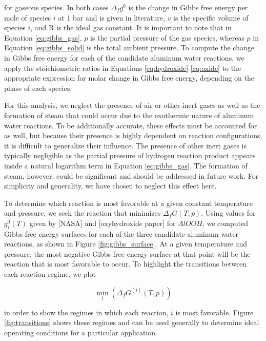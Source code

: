 \documentclass[preprint,12pt,3p]{elsarticle}
\begin{document}
\noindent for gaseous species. In both cases $\Delta_f g^0$ is the change in
Gibbs free energy per mole of species $i$ at 1 bar and is given in literature,
$v$ is the specific volume of species $i$, and R is the ideal gas constant. It
is important to note that in Equation \ref{eq:gibbs_gas}, $p$ is the partial
pressure of the gas species, whereas $p$ in Equation \ref{eq:gibbs_solid} is the
total ambient pressure. To compute the change in Gibbs free energy for each of
the candidate aluminum water reactions, we apply the stoichiometric ratios in
Equations \ref{eq:hydroxide}-\ref{eq:oxide} to the appropriate expression for
molar change in Gibbs free energy, depending on the phase of each species.

For this analysis, we neglect the presence of air or other inert gases as well
as the formation of steam that could occur due to the exothermic nature of
aluminum water reactions. To be additionally accurate, these effects must be
accounted for as well, but because their presence is highly dependent on
reaction configurations, it is difficult to generalize their influence. The
presence of other inert gases is typically negligible as the partial pressure of
hydrogen reaction product appears inside a natural logarithm term in Equation
\ref{eq:gibbs_gas}. The formation of steam, however, could be significant and
should be addressed in future work. For simplicity and generality, we have
chosen to neglect this effect here.

To determine which reaction is most favorable at a given constant temperature
and pressure, we seek the reaction that minimizes $\Delta_f G(T,p)$. Using
values for $g_i^0(T)$ given by [NASA] and [oxyhydroxide paper] for $AlOOH$, we
computed Gibbs free energy surfaces for each of the three candidate aluminum
water reactions, as shown in Figure \ref{fig:gibbs_surface}. At a given
temperature and pressure, the most negative Gibbs free energy surface at that
point will be the reaction that is most favorable to occur. To highlight the
transitions between each reaction regime, we plot

\begin{equation}
  \min_i(\Delta_fG^{(i)}(T,p))
  \label{eq:min_gibbs}
\end{equation}

\noindent in order to show the regimes in which each reaction, $i$ is most
favorable.  Figure \ref{fig:transitions} shows these regimes and can be used
generally to determine ideal operating conditions for a particular application.
\end{document}
